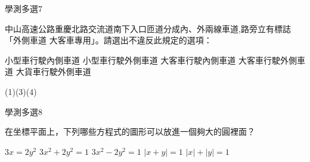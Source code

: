 \begin{QUESTIONS}
    \begin{QUESTION}
        \begin{ExamInfo}{93}{學測}{多選}{7}
        \end{ExamInfo}
        \begin{ExamAnsRateInfo}{56}{77}{61}{30}
        \end{ExamAnsRateInfo}
        \begin{QBODY}
            中山高速公路重慶北路交流道南下入口匝道分成內、外兩線車道,路旁立有標誌 「外側車道 大客車專用」。請選出不違反此規定的選項：
            \begin{QOPS}
                \QOP 小型車行駛內側車道 
                \QOP 小型車行駛外側車道 
                \QOP 大客車行駛內側車道 
                \QOP 大客車行駛外側車道 
                \QOP 大貨車行駛外側車道
            \end{QOPS}
        \end{QBODY}
        \begin{QFROMS}
        \end{QFROMS}
        \begin{QTAGS}\end{QTAGS}
        \begin{QANS}
            (1)(3)(4)
        \end{QANS}
        \begin{QSOLLIST}
        \end{QSOLLIST}
        \begin{QEMPTYSPACE}
        \end{QEMPTYSPACE}
    \end{QUESTION}
    \begin{QUESTION}
        \begin{ExamInfo}{93}{學測}{多選}{8}
        \end{ExamInfo}
        \begin{ExamAnsRateInfo}{43}{77}{39}{13}
        \end{ExamAnsRateInfo}
        \begin{QBODY}
            在坐標平面上，下列哪些方程式的圖形可以放進一個夠大的圓裡面？ 
            \begin{QOPS} 
                \QOP $3x=2y^2$ 
                \QOP $3x^2+2y^2=1$ 
                \QOP $3x^2-2y^2=1$ \QOP $|x+y|=1$ 
                \QOP $|x|+|y|=1$
            \end{QOPS}
        \end{QBODY}

\end{QUESTION}
\end{QUESTIONS}
